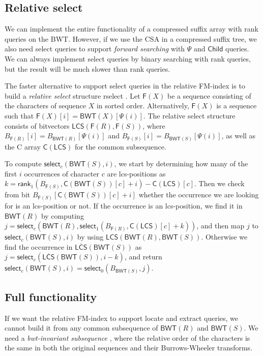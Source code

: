 \documentclass[a4paper,11pt]{llncs}
\renewcommand{\complement}[1]{\ensuremath{\overline{ #1 }}}
\newcommand{\BWT}{\textsf{BWT}}
\newcommand{\CSA}{\textsf{CSA}}
\newcommand{\mBWT}{\ensuremath{\mathsf{BWT}}}
\newcommand{\mF}{\ensuremath{\mathsf{F}}}
\newcommand{\C}{\textsf{C}}
\newcommand{\mC}{\ensuremath{\mathsf{C}}}
\newcommand{\mLCS}{\ensuremath{\mathsf{LCS}}}
\newcommand{\mCS}{\ensuremath{\complement{\mathsf{LCS}}}}
\newcommand{\rselect}{\textsf{rselect}}
\newcommand{\locate}{\textsf{locate}}
\newcommand{\extract}{\textsf{extract}}
\newcommand{\rank}{\textsf{rank}}
\newcommand{\select}{\textsf{select}}
\newcommand{\mPsi}{\ensuremath{\mathsf{\Psi}}}
\newcommand{\mrank}{\ensuremath{\mathsf{rank}}}
\newcommand{\mselect}{\ensuremath{\mathsf{select}}}
\newcommand{\mChild}{\ensuremath{\mathsf{Child}}}
\begin{document}
\subsection{Relative select}

We can implement the entire functionality of a compressed suffix array with \rank{} queries on the \BWT. However, if we use the \CSA{} in a compressed suffix tree, we also need \select{} queries to support \emph{forward searching} with $\mPsi$ and $\mChild$ queries. We can always implement \select{} queries by binary searching with \rank{} queries, but the result will be much slower than \rank{} queries.

The faster alternative to support \select{} queries in the relative FM-index is to build a \emph{relative select} structure \rselect{} \cite{Boucher2015}. Let $\mF(X)$ be a sequence consisting of the characters of sequence $X$ in sorted order. Alternatively, $\mF(X)$ is a sequence such that $\mF(X)[i] = \mBWT(X)[\mPsi(i)]$. The relative select structure consists of bitvectors $\mLCS(\mF(R), \mF(S))$, where $B_{\mF(R)}[i] = B_{\mBWT(R)}[\mPsi(i)]$ and $B_{\mF(S)}[i] = B_{\mBWT(S)}[\mPsi(i)]$, as well as the \C{} array $\mC(\mLCS)$ for the common subsequence.

To compute $\mselect_{c}(\mBWT(S), i)$, we start by determining how many of the first $i$ occurrences of character $c$ are lcs-positions as $k = \mrank_{1}(B_{\mF(S)}, \mC(\mBWT(S))[c] + i) - \mC(\mLCS)[c]$. Then we check from bit $B_{\mF(S)}[\mC(\mBWT(S))[c] + i]$ whether the occurrence we are looking for is an lcs-position or not. If the occurrence is an lcs-position, we find it in $\mBWT(R)$ by computing $j = \mselect_{c}(\mBWT(R), \mselect_{1}(B_{\mF(R)}, \mC(\mLCS)[c] + k))$, and then map $j$ to $\mselect_{c}(\mBWT(S), i)$ by using $\mLCS(\mBWT(R), \mBWT(S))$. Otherwise we find the occurrence in $\mCS(\mBWT(S))$ as $j = \mselect_{c}(\mCS(\mBWT(S)), i-k)$, and return $\mselect_{c}(\mBWT(S), i) = \mselect_{0}(B_{\mBWT(S)}, j)$.

\subsection{Full functionality}

If we want the relative FM-index to support \locate{} and \extract{} queries, we cannot build it from any common subsequence of $\mBWT(R)$ and $\mBWT(S)$. We need a \emph{bwt-invariant subsequence} \cite{Belazzougui2014}, where the relative order of the characters is the same in both the original sequences and their Burrows-Wheeler transforms.
\end{document}
